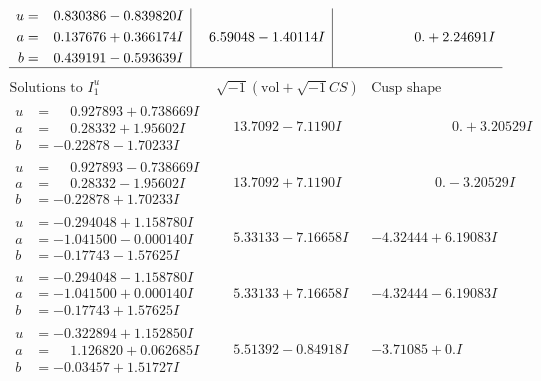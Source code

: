 \documentclass[1p]{elsarticle_modified}
\theoremstyle{definition}
\newcommand{\I}{\sqrt{-1}}
\begin{document}
$$\begin{array}{c|c|c}
\begin{aligned}
u &= \phantom{-}0.830386 - 0.839820 I \\
a &= \phantom{-}0.137676 + 0.366174 I \\
b &= \phantom{-}0.439191 - 0.593639 I\end{aligned}
 & \phantom{-}6.59048 - 1.40114 I & \phantom{-0.000000 -}0. + 2.24691 I\\
 \hline 
 \end{array}$$\newpage$$\begin{array}{c|c|c}  
\text{Solutions to }I^u_{1}& \I (\text{vol} + \sqrt{-1}CS) & \text{Cusp shape}\\
 \hline 
\begin{aligned}
u &= \phantom{-}0.927893 + 0.738669 I \\
a &= \phantom{-}0.28332 + 1.95602 I \\
b &= -0.22878 - 1.70233 I\end{aligned}
 & \phantom{-}13.7092 - 7.1190 I & \phantom{-0.000000 -}0. + 3.20529 I \\ \hline\begin{aligned}
u &= \phantom{-}0.927893 - 0.738669 I \\
a &= \phantom{-}0.28332 - 1.95602 I \\
b &= -0.22878 + 1.70233 I\end{aligned}
 & \phantom{-}13.7092 + 7.1190 I & \phantom{-0.000000 } 0. - 3.20529 I \\ \hline\begin{aligned}
u &= -0.294048 + 1.158780 I \\
a &= -1.041500 - 0.000140 I \\
b &= -0.17743 - 1.57625 I\end{aligned}
 & \phantom{-}5.33133 - 7.16658 I & -4.32444 + 6.19083 I \\ \hline\begin{aligned}
u &= -0.294048 - 1.158780 I \\
a &= -1.041500 + 0.000140 I \\
b &= -0.17743 + 1.57625 I\end{aligned}
 & \phantom{-}5.33133 + 7.16658 I & -4.32444 - 6.19083 I \\ \hline\begin{aligned}
u &= -0.322894 + 1.152850 I \\
a &= \phantom{-}1.126820 + 0.062685 I \\
b &= -0.03457 + 1.51727 I\end{aligned}
 & \phantom{-}5.51392 - 0.84918 I & -3.71085 + 0. I\phantom{ +0.000000I} \\ \hline\begin{aligned}

\end{aligned}
\end{array}$$
\end{document}
